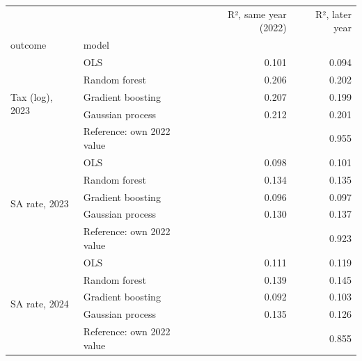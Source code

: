 \begin{tabular}{llrr}
\toprule
 &  & R², same year (2022) & R², later year \\
outcome & model &  &  \\
\midrule
\multirow[t]{5}{*}{Tax (log), 2023} & OLS & 0.101 & 0.094 \\
 & Random forest & 0.206 & 0.202 \\
 & Gradient boosting & 0.207 & 0.199 \\
 & Gaussian process & 0.212 & 0.201 \\
 & Reference: own 2022 value &  & 0.955 \\
\cline{1-4}
\multirow[t]{5}{*}{SA rate, 2023} & OLS & 0.098 & 0.101 \\
 & Random forest & 0.134 & 0.135 \\
 & Gradient boosting & 0.096 & 0.097 \\
 & Gaussian process & 0.130 & 0.137 \\
 & Reference: own 2022 value &  & 0.923 \\
\cline{1-4}
\multirow[t]{5}{*}{SA rate, 2024} & OLS & 0.111 & 0.119 \\
 & Random forest & 0.139 & 0.145 \\
 & Gradient boosting & 0.092 & 0.103 \\
 & Gaussian process & 0.135 & 0.126 \\
 & Reference: own 2022 value &  & 0.855 \\
\cline{1-4}
\bottomrule
\end{tabular}

